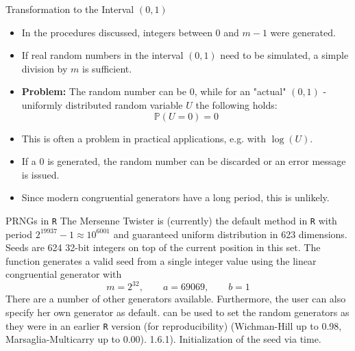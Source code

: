\documentclass[11pt,compress,t,notes=noshow, xcolor=table]{beamer}
\begin{document}
\begin{vbframe}{Transformation to the Interval $(0, 1)$}

\vspace*{-0.4cm}

\begin{itemize}
\item In the procedures discussed, integers between $0$ and $m - 1$ were generated.
\item If real random numbers in the interval $(0, 1)$ need to be simulated, a simple division by $m$ is sufficient.
\item \textbf{Problem:} The random number can be $0$, while for an "actual" $(0, 1)$ - uniformly distributed random variable $U$ the following holds:
$$
\mathbb{P}(U = 0) = 0
$$
\item This is often a problem in practical applications, e.g. with $\log(U)$.
\item If a $0$ is generated, the random number can be discarded or an error message is issued.
\item Since modern congruential generators have a long period, this is unlikely.
\end{itemize}
%

\end{vbframe}

\begin{vbframe}{PRNGs in \texttt{R}}
The Mersenne Twister is (currently) the default method in \texttt{R} with period
$2^{19937} - 1 \approx 10^{6001}$ and guaranteed uniform distribution in
623 dimensions.
Seeds are 624 32-bit integers on top of the current position in this set. The  function generates a valid seed from a
single integer value using the linear congruential generator with
$$
  m=2^{32}, \qquad a=69069, \qquad b=1
$$
There are a number of other generators available. Furthermore, the
user can also specify her own generator as default.
 can be used to set the random generators as they were in an earlier \texttt{R} version (for reproducibility) (Wichman-Hill up to 0.98, Marsaglia-Multicarry up to 0.00).
1.6.1). Initialization of the seed via time.
\end{vbframe}
\end{document}
